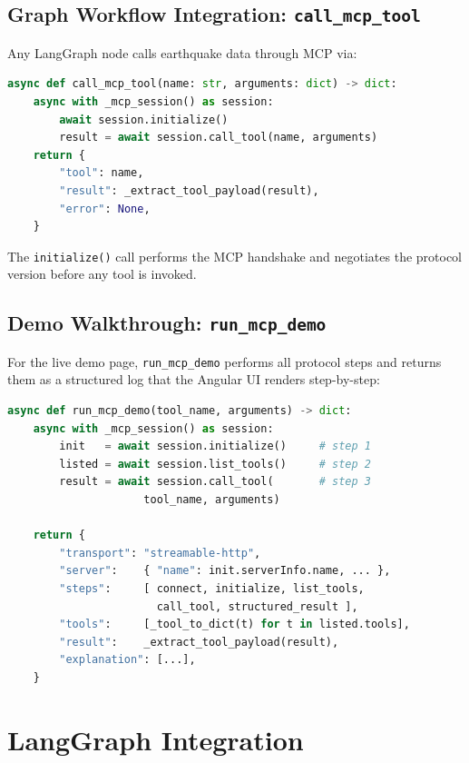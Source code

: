 \documentclass[11pt,a4paper]{article}
\begin{document}
\subsection{Graph Workflow Integration: \texttt{call\_mcp\_tool}}

Any LangGraph node calls earthquake data through MCP via:

\begin{lstlisting}[style=codestyle, language=Python]
async def call_mcp_tool(name: str, arguments: dict) -> dict:
    async with _mcp_session() as session:
        await session.initialize()
        result = await session.call_tool(name, arguments)
    return {
        "tool": name,
        "result": _extract_tool_payload(result),
        "error": None,
    }
\end{lstlisting}

The \texttt{initialize()} call performs the MCP handshake and negotiates the
protocol version before any tool is invoked.

\subsection{Demo Walkthrough: \texttt{run\_mcp\_demo}}

For the live demo page, \texttt{run\_mcp\_demo} performs all protocol steps and
returns them as a structured log that the Angular UI renders step-by-step:

\begin{lstlisting}[style=codestyle, language=Python]
async def run_mcp_demo(tool_name, arguments) -> dict:
    async with _mcp_session() as session:
        init   = await session.initialize()     # step 1
        listed = await session.list_tools()     # step 2
        result = await session.call_tool(       # step 3
                     tool_name, arguments)

    return {
        "transport": "streamable-http",
        "server":    { "name": init.serverInfo.name, ... },
        "steps":     [ connect, initialize, list_tools,
                       call_tool, structured_result ],
        "tools":     [_tool_to_dict(t) for t in listed.tools],
        "result":    _extract_tool_payload(result),
        "explanation": [...],
    }
\end{lstlisting}

\section{LangGraph Integration}
\end{document}
